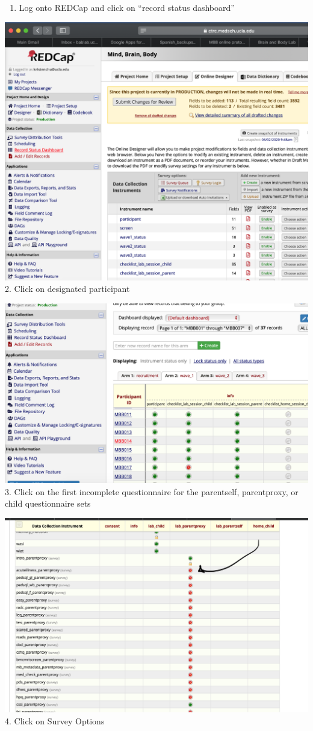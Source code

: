 \documentclass[]{book}
\providecommand{\tightlist}{%
  \setlength{\itemsep}{0pt}\setlength{\parskip}{0pt}}
\begin{document}
\begin{enumerate}
\def\labelenumi{\arabic{enumi}.}
\tightlist
\item
  Log onto REDCap and click on ``record status dashboard''
\end{enumerate}

\includegraphics{images/redcap_code/1.png}
2. Click on designated participant

\includegraphics{images/redcap_code/2.png}
3. Click on the first incomplete questionnaire for the parentself, parentproxy, or child questionnaire sets

\includegraphics{images/redcap_code/3.png}
4. Click on Survey Options
\end{document}
